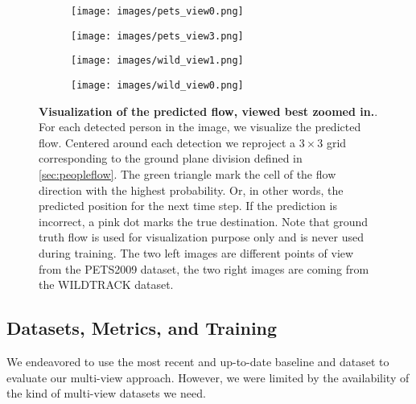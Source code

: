 \documentclass[10pt,twocolumn,letterpaper]{article}
\begin{document}
\begin{figure*}[h]

    \centering
    \begin{subfigure}[c]{0.235\textwidth}
        \centering
        \texttt{[image: images/pets\_view0.png]}
    \end{subfigure}
    \hfill
    \begin{subfigure}[c]{0.235\textwidth}  
        \centering 
        \texttt{[image: images/pets\_view3.png]}
    \end{subfigure}
    \hfill
    \begin{subfigure}[c]{0.235\textwidth}   
        \centering 
        \texttt{[image: images/wild\_view1.png]}
    \end{subfigure}
    \hfill
    \begin{subfigure}[c]{0.235\textwidth}   
        \centering 
        \texttt{[image: images/wild\_view0.png]}
    \end{subfigure}

\caption{\textbf{Visualization of the predicted flow, viewed best zoomed in.}. For each detected person in the image, we visualize the predicted flow.
Centered around each detection we reproject a $3 \times 3$ grid corresponding to the ground plane division defined in \cref{sec:peopleflow}.
The green triangle mark the cell of the flow direction with the highest probability. Or, in other words, the predicted position for the next time step.
If the prediction is incorrect, a pink dot marks the true destination. Note that ground truth flow is used for visualization purpose only and is never used during training.
The two left images are different points of view from the PETS2009 dataset, the two right images are coming from the WILDTRACK dataset.
}
\label{fig:visu_flow}

\end{figure*}







%
 


\subsection{Datasets, Metrics, and Training}

We endeavored to use the most recent and up-to-date baseline and dataset to evaluate our multi-view approach. However, we were limited by the availability of the kind of multi-view datasets we need.
\end{document}
